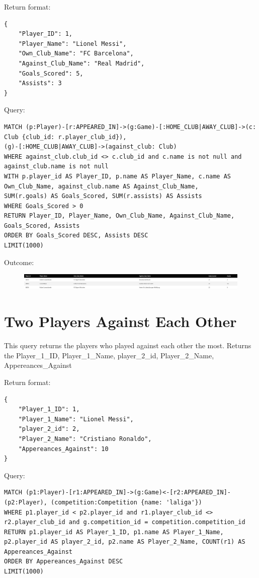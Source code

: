 \documentclass{Configuration_Files/PoliMi3i_thesis}
\begin{document}
Return format:
\begin{lstlisting}[style=json]
{
    "Player_ID": 1,
    "Player_Name": "Lionel Messi",
    "Own_Club_Name": "FC Barcelona",
    "Against_Club_Name": "Real Madrid",
    "Goals_Scored": 5,
    "Assists": 3
}
\end{lstlisting}


Query:

\begin{lstlisting}[language=Cypher]
MATCH (p:Player)-[r:APPEARED_IN]->(g:Game)-[:HOME_CLUB|AWAY_CLUB]->(c: Club {club_id: r.player_club_id}), 
(g)-[:HOME_CLUB|AWAY_CLUB]->(against_club: Club)
WHERE against_club.club_id <> c.club_id and c.name is not null and against_club.name is not null
WITH p.player_id AS Player_ID, p.name AS Player_Name, c.name AS Own_Club_Name, against_club.name AS Against_Club_Name,
SUM(r.goals) AS Goals_Scored, SUM(r.assists) AS Assists
WHERE Goals_Scored > 0
RETURN Player_ID, Player_Name, Own_Club_Name, Against_Club_Name, Goals_Scored, Assists
ORDER BY Goals_Scored DESC, Assists DESC
LIMIT(1000)
\end{lstlisting}


Outcome:

\begin{figure}[H]
    \centering
    \includegraphics[width=\linewidth]{Project Template/Images/query_output/q2.png}
\end{figure}



\section{Two Players Against Each Other}
This query returns the players who played against each other the most.
Returns the Player\_1\_ID, Player\_1\_Name, player\_2\_id, Player\_2\_Name, Appereances\_Against

Return format:
\begin{lstlisting}[style=json]
{
    "Player_1_ID": 1,
    "Player_1_Name": "Lionel Messi",
    "player_2_id": 2,
    "Player_2_Name": "Cristiano Ronaldo",
    "Appereances_Against": 10
}
\end{lstlisting}


Query:

\begin{lstlisting}[language=Cypher]
MATCH (p1:Player)-[r1:APPEARED_IN]->(g:Game)<-[r2:APPEARED_IN]-(p2:Player), (competition:Competition {name: 'laliga'})
WHERE p1.player_id < p2.player_id and r1.player_club_id <> r2.player_club_id and g.competition_id = competition.competition_id
RETURN p1.player_id AS Player_1_ID, p1.name AS Player_1_Name, p2.player_id AS player_2_id, p2.name AS Player_2_Name, COUNT(r1) AS Appereances_Against
ORDER BY Appereances_Against DESC
LIMIT(1000)
\end{lstlisting}
\end{document}
